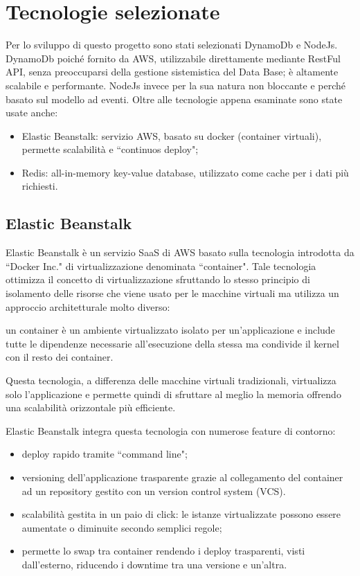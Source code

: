 \section{Tecnologie selezionate}
Per lo sviluppo di questo progetto sono stati selezionati DynamoDb e NodeJs. DynamoDb poiché fornito da AWS, utilizzabile direttamente mediante RestFul API, senza preoccuparsi della gestione sistemistica del Data Base; è altamente scalabile e performante.
NodeJs invece per la sua natura non bloccante e perché basato sul modello ad eventi. Oltre alle tecnologie appena esaminate sono state usate anche:
\begin{itemize}
	\item Elastic Beanstalk: servizio AWS, basato su docker (container virtuali), permette scalabilità e ``continuos deploy";
	\item Redis: all-in-memory key-value database, utilizzato come cache per i dati più richiesti.
\end{itemize}


\subsection{Elastic Beanstalk}
Elastic Beanstalk è un servizio SaaS di AWS basato sulla tecnologia introdotta da ``Docker Inc." di virtualizzazione denominata ``container". Tale tecnologia ottimizza il concetto di virtualizzazione sfruttando lo stesso principio di isolamento delle risorse che viene usato per le macchine virtuali ma utilizza un approccio architetturale molto diverso: 

un container è un ambiente virtualizzato isolato per un'applicazione e include tutte le dipendenze necessarie all'esecuzione della stessa ma condivide il kernel con il resto dei container. 

Questa tecnologia, a differenza delle macchine virtuali tradizionali, virtualizza solo l'applicazione e permette quindi di sfruttare al meglio la memoria offrendo una scalabilità orizzontale più efficiente.

Elastic Beanstalk integra questa tecnologia con numerose feature di contorno: 
\begin{itemize}
	\item deploy rapido tramite ``command line";
	\item versioning dell'applicazione trasparente grazie al collegamento del container ad un repository gestito con un  version control system (VCS).

	\item scalabilità gestita in un paio di click: le istanze virtualizzate possono essere aumentate o diminuite secondo semplici regole;
	\item permette lo swap tra container rendendo i deploy trasparenti, visti dall'esterno, riducendo i downtime tra una versione e un'altra.
\end{itemize}

